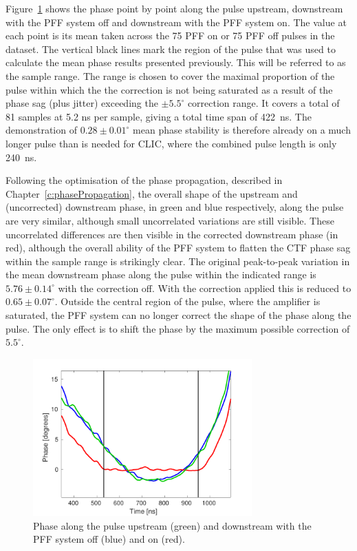Figure~\ref{f:BestFF_MeanPhaseAlong} shows the phase point by point along the pulse upstream, downstream with the PFF system off and downstream with the PFF system on. The value at each point is its mean taken across the 75 PFF on or 75 PFF off pulses in the dataset. The vertical black lines mark the region of the pulse that was used to calculate the mean phase results presented previously. This will be referred to as the sample range. The range is chosen to cover the maximal proportion of the pulse within which the the correction is not being saturated as a result of the phase sag (plus jitter) exceeding the \(\pm5.5^\circ\) correction range. It covers a total of 81 samples at 5.2 ns per sample, giving a total time span of 422~ns. The demonstration of \(0.28\pm0.01^\circ\) mean phase stability is therefore already on a much longer pulse than is needed for CLIC, where the combined pulse length is only 240~ns.

Following the optimisation of the phase propagation, described in Chapter~\ref{c:phasePropagation}, the overall shape of the upstream and (uncorrected) downstream phase, in green and blue respectively, along the pulse are very similar, although small uncorrelated variations are still visible. These uncorrelated differences are then visible in the corrected downstream phase (in red), although the overall ability of the PFF system to flatten the CTF phase sag within the sample range is strikingly clear. The original peak-to-peak variation in the mean downstream phase along the pulse within the indicated range is \(5.76\pm0.14^\circ\) with the correction off. With the correction applied this is reduced to \(0.65\pm0.07^\circ\). Outside the central region of the pulse, where the amplifier is saturated, the PFF system can no longer correct the shape of the phase along the pulse. The only effect is to shift the phase by the maximum possible correction of \(5.5^\circ\).

\begin{figure}
  \centering
  \includegraphics[width=0.75\textwidth]{Figures/feedforward/BestFF_MeanPhaseAlong}
  \caption{Phase along the pulse upstream (green) and downstream with the PFF system off (blue) and on (red).}
  \label{f:BestFF_MeanPhaseAlong}
\end{figure}


